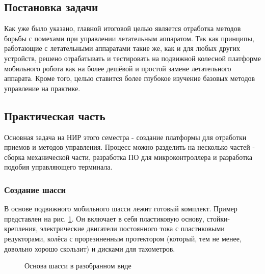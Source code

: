\documentclass[14pt,a4paper,russian]{scrartcl}
\begin{document}
\subsection{Постановка задачи}

Как уже было указано, главной итоговой целью является отработка методов
борьбы с помехами при управлении летательным аппаратом. Так как принципы,
работающие с летательными аппаратами такие же, как и для любых других устройств,
решено отрабатывать и тестировать на подвижной колесной платформе мобильного робота
как на более дешёвой и простой замене летательного аппарата. Кроме того, целью ставится
более глубокое изучение базовых методов управление на практике.


\newpage

\subsection{Практическая часть}
Основная задача на НИР этого семестра - создание платформы для отработки
приемов и методов управления. Процесс можно разделить на
несколько частей - сборка механической части, разработка ПО для микроконтроллера и 
разработка подобия управляющего терминала.

\subsubsection{Создание шасси}
В основе подвижного мобильного шасси лежит готовый комплект. Пример
представлен на рис. \ref{fig:shassis_dissassembled}. Он включает в себя пластиковую основу,
стойки-крепления, электрические двигатели постоянного тока с пластиковыми редукторами,
колёса с прорезиненным протектором (который, тем не менее, довольно хорошо скользит)
и дисками для тахометров.
\begin{figure}[h]
    \caption{Основа шасси в разобранном виде}
    \label{fig:shassis_dissassembled}
\end{figure}
\end{document}
